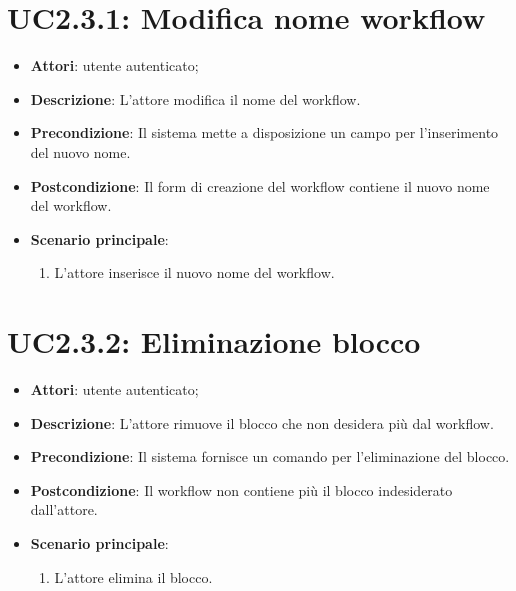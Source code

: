 \section{UC2.3.1: Modifica nome workflow}
\label{UC2.3.1}
\begin{itemize}
	\item \textbf{Attori}: utente autenticato;
	\item \textbf{Descrizione}: L'attore modifica il nome del workflow.
	\item \textbf{Precondizione}: Il sistema mette a disposizione un campo per l'inserimento del nuovo nome.
	\item \textbf{Postcondizione}: Il form di creazione del workflow contiene il nuovo nome del workflow.
	\item \textbf{Scenario principale}:
	\begin{enumerate} \item L'attore inserisce il nuovo nome del workflow.\end{enumerate}
\end{itemize}

\section{UC2.3.2: Eliminazione blocco}
\label{UC2.3.2}
\begin{itemize}
	\item \textbf{Attori}: utente autenticato;
	\item \textbf{Descrizione}: L'attore rimuove il blocco che non desidera più dal workflow.
	\item \textbf{Precondizione}: Il sistema fornisce un comando per l'eliminazione del blocco.
	\item \textbf{Postcondizione}: Il workflow non contiene più il blocco indesiderato dall'attore.
	\item \textbf{Scenario principale}:
	\begin{enumerate} \item L'attore elimina il blocco.\end{enumerate}
\end{itemize}

